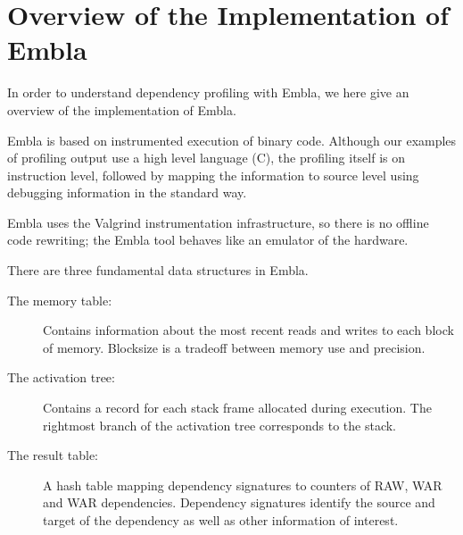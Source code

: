 \section{Overview of the Implementation of Embla}

In order to understand dependency profiling with Embla, we 
here give an overview of the implementation of Embla. 

Embla is based on instrumented execution of binary code. Although
our examples of profiling output use a high level language (C),
the profiling itself is on instruction level, followed by 
mapping the information to source level using debugging information 
in the standard way.

Embla uses the Valgrind instrumentation infrastructure, so there
is no offline code rewriting; the Embla tool behaves like an emulator
of the hardware.

There are three fundamental data structures in Embla.
\begin{description}
\item[The memory table:]
Contains information about the most recent reads and writes to each
block of memory. Blocksize is a tradeoff between memory use and 
precision. 
\item[The activation tree:]
Contains a record for each stack frame allocated during execution. 
The rightmost branch of the activation tree corresponds to the stack.
\item[The result table:]
A hash table mapping dependency signatures to counters of RAW, WAR 
and WAR dependencies. Dependency signatures identify the source and
target of the dependency as well as other information of interest.
\end{description}
